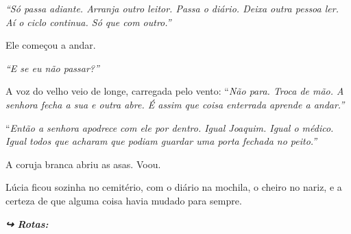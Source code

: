 \noindent \textit{\textquotedblleft{}Só passa adiante. Arranja outro leitor. Passa o diário. Deixa outra pessoa ler. Aí o ciclo continua. Só que com outro.\textquotedblright{}}

\noindent Ele começou a andar.

\noindent \textit{\textquotedblleft{}E se eu não passar?\textquotedblright{}}

\noindent A voz do velho veio de longe, carregada pelo vento:
\noindent \textquotedblleft{\textit{Não para. Troca de mão. A senhora fecha a sua e outra abre. É assim que coisa enterrada aprende a andar.\textquotedblright{}}}

\noindent \textquotedblleft{\textit{Então a senhora apodrece com ele por dentro. Igual Joaquim. Igual o médico. Igual todos que acharam que podiam guardar uma porta fechada no peito.\textquotedblright{}}}

\noindent A coruja branca abriu as asas. Voou.

\noindent Lúcia ficou sozinha no cemitério, com o diário na mochila, o cheiro no nariz, e a certeza de que alguma coisa havia mudado para sempre.

\vspace{0.5em}
\noindent\textit{\textbf{↪ Rotas:}  \rotasep {}}